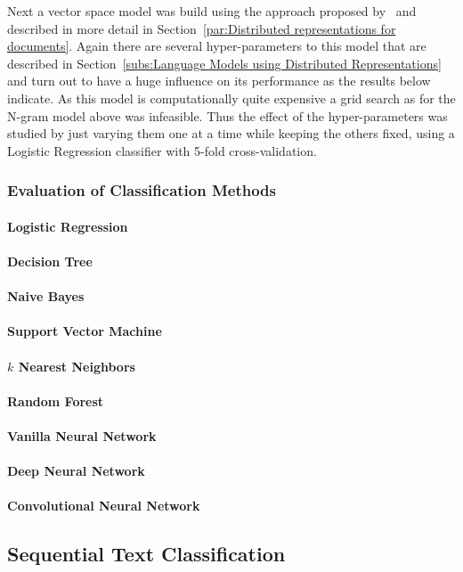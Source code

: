 Next a vector space model was build using the approach proposed by~\cite{Le:2014aa} and described in more detail in Section~\ref{par:Distributed representations for documents}. Again there are several hyper-parameters to this model that are described in Section~\ref{subs:Language Models using Distributed Representations} and turn out to have a huge influence on its performance as the results below indicate. As this model is computationally quite expensive a grid search as for the N-gram model above was infeasible. Thus the effect of the hyper-parameters was studied by just varying them one at a time while keeping the others fixed, using a Logistic Regression classifier with 5-fold cross-validation.

\subsubsection*{Evaluation of Classification Methods}
\label{subs:Evaluation of Classification Methods}

\paragraph{Logistic Regression}
\label{par:Logistic Regression}

\paragraph{Decision Tree}
\label{par:Decision Tree}

\paragraph{Naive Bayes}
\label{par:Naive Bayes}

\paragraph{Support Vector Machine}
\label{par:Support Vector Machine}

\paragraph{$k$ Nearest Neighbors}
\label{par:k Nearest Neighbors}

\paragraph{Random Forest}
\label{par:Random Forest}

\paragraph{Vanilla Neural Network}
\label{par:Vanilla Neural Network}

\paragraph{Deep Neural Network}
\label{par:Deep Neural Network}

\paragraph{Convolutional Neural Network}
\label{par:Convolutional Neural Network}



\subsection{Sequential Text Classification}
